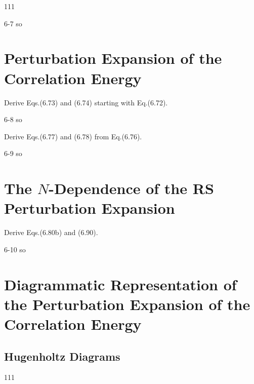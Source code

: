 \documentclass[a4paper]{book}
\begin{document}
	\begin{exercise}
	111
	\end{exercise}
	
	\begin{solution}
		6-7 so
	\end{solution}
	
	\section{Perturbation Expansion of the Correlation Energy}
	
	\begin{exercise}
	Derive Eqs.(6.73) and (6.74) starting with Eq.(6.72).
	\end{exercise}
	
	\begin{solution}
		6-8 so
	\end{solution}
	
	\begin{exercise}
	Derive Eqs.(6.77) and (6.78) from Eq.(6.76).
	\end{exercise}
	
	\begin{solution}
		6-9 so
	\end{solution}
	
	\section{The \texorpdfstring{$N$}--Dependence of the RS Perturbation Expansion}
	
	\begin{exercise}
	Derive Eqs.(6.80b) and (6.90).
	\end{exercise}
	
	\begin{solution}
		6-10 so
	\end{solution}
	
	\section{Diagrammatic Representation of the Perturbation Expansion of the Correlation Energy}
	
	\subsection{Hugenholtz Diagrams}
	
	\begin{exercise}
	111
	\end{exercise}
	
\end{document}
